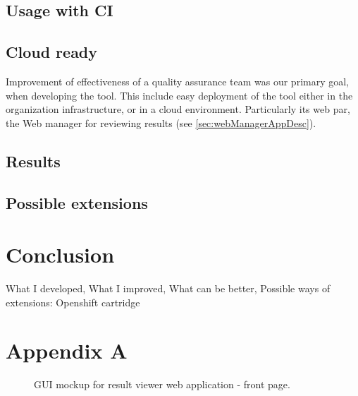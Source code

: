 \documentclass[11pt,oneside,final]{fithesis2}
\begin{document}
  \section{Usage with CI}
  
  \section{Cloud ready}
  \label{sec:cloudReady}
  Improvement of effectiveness of a quality assurance team was our primary goal, when developing the tool. This include easy 
  deployment of the tool either in the organization infrastructure, or in a cloud environment. Particularly its web par, the
  Web manager for reviewing results (see \ref{sec:webManagerAppDesc}).
  
  \section{Results}
  
  \section{Possible extensions}
  \label{sec:plannedExtensions}
  
\chapter{Conclusion}
What I developed, What I improved, What can be better, Possible ways of extensions: Openshift cartridge

\appendix
\chapter{Appendix A}
\label{appendeix:a}

\begin{figure}[!htb]
    \begin{center}
    \leavevmode
    \centerline{}
    \end{center}
    \caption{GUI mockup for result viewer web application - front page.}
    \label{fig:frontPageMock}
\end{figure}
\end{document}

